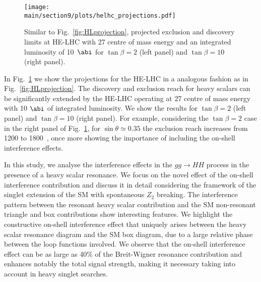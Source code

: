 \begin{figure}[t]
  \centering
\texttt{[image: \\main/section9/plots/helhc\_projections.pdf]}
  \caption{
  Similar to Fig.~\ref{fig:HLprojection}, projected exclusion and discovery limits at HE-LHC with 27 \UTeV centre of mass energy and an integrated luminosity of 10~$\abi$ for $\tan\beta=2$ (left panel) and $\tan\beta=10$ (right panel).
  }
  \label{fig:HEprojection}
\end{figure} 

In Fig.~\ref{fig:HEprojection} we show the projections for the HE-LHC in a analogous fashion as in Fig.~\ref{fig:HLprojection}. The discovery and exclusion reach for heavy scalars can be significantly extended by the HE-LHC operating at 27 \UTeV centre of mass energy with 10 $\abi$ of integrated luminosity. We show the results for $\tan\beta=2$ (left panel) and $\tan\beta=10$ (right panel). 
For example, considering the $\tan\beta=2$ case in the right panel of Fig.~\ref{fig:HEprojection}, for $\sin\theta\simeq 0.35$ the exclusion reach increases from 1200 to 1800~\UGeV, once more showing the importance of including the on-shell interference effects.

\label{sec:conclude}

In this study, we analyse the interference effects in the $gg\to HH$ process in the presence of a heavy scalar resonance.
We focus on the novel effect of the on-shell interference contribution and discuss it in detail considering the framework of the singlet extension of the SM with spontaneous $Z_2$ breaking. %
The interference pattern between the resonant heavy scalar contribution and the SM non-resonant triangle and box contributions show interesting features. 
We highlight the constructive on-shell interference effect that uniquely arises between the heavy scalar resonance diagram and the SM box diagram, due to a large relative phase between the loop functions involved.
We observe that the on-shell interference effect can be as large as 40\% of the Breit-Wigner resonance contribution and enhances notably the total signal strength, making it necessary taking into account in heavy singlet searches.

